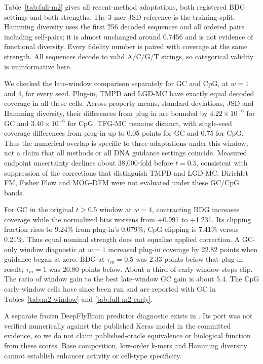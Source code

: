 \documentclass{article}
\begin{document}
Table~\ref{tab:full-m2} gives all recent-method adaptations, both registered BDG settings and both strengths. The 3-mer JSD reference is the training split. Hamming diversity uses the first 256 decoded sequences and all ordered pairs including self-pairs; it is almost unchanged around 0.7456 and is not evidence of functional diversity. Every fidelity number is paired with coverage at the same strength. All sequences decode to valid A/C/G/T strings, so categorical validity is uninformative here.

We checked the late-window comparison separately for GC and CpG, at $w=1$ and $4$, for every seed. Plug-in, TMPD and LGD-MC have exactly equal decoded coverage in all these cells. Across property means, standard deviations, JSD and Hamming diversity, their differences from plug-in are bounded by $4.22\times10^{-6}$ for GC and $3.40\times10^{-6}$ for CpG. TFG-MC remains distinct, with single-seed coverage differences from plug-in up to 0.05 points for GC and 0.75 for CpG. Thus the numerical overlap is specific to three adaptations under this window, not a claim that all methods or all DNA guidance settings coincide. Measured endpoint uncertainty declines about 38,000-fold before $t=0.5$, consistent with suppression of the corrections that distinguish TMPD and LGD-MC. Dirichlet FM, Fisher Flow and MOG-DFM were not evaluated under these GC/CpG bands.

For GC in the original $t\ge0.5$ window at $w=4$, contracting BDG increases coverage while the normalized bias worsens from +0.997 to +1.231. Its clipping fraction rises to 9.24\% from plug-in's 0.079\%; CpG clipping is 7.41\% versus 0.21\%. Thus equal nominal strength does not equalize applied correction. A GC-only window diagnostic at $w=1$ increased plug-in coverage by 22.82 points when guidance began at zero. BDG at $\tau_m=0.5$ was 2.33 points below that plug-in result; $\tau_m=1$ was 20.80 points below. About a third of early-window steps clip. The ratio of window gain to the best late-window GC gain is about 5.4. The CpG early-window cells have since been run and are reported with GC in Tables~\ref{tab:m2-window} and \ref{tab:full-m2-early}.

A separate frozen DeepFlyBrain predictor diagnostic exists in . Its port was not verified numerically against the published Keras model in the committed evidence, so we do not claim published-oracle equivalence or biological function from these scores. Base composition, low-order k-mers and Hamming diversity cannot establish enhancer activity or cell-type specificity.
\end{document}

